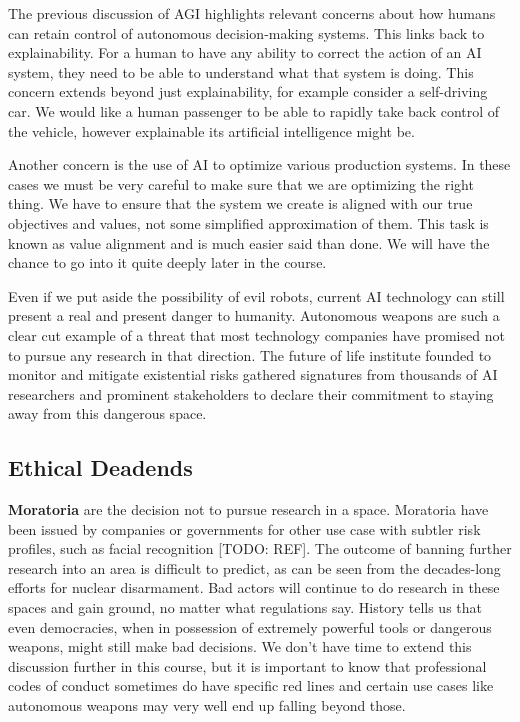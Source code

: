 \documentclass[
]{book}
\theoremstyle{definition}
\theoremstyle{definition}
\theoremstyle{definition}
\theoremstyle{definition}
\theoremstyle{remark}
\begin{document}
The previous discussion of AGI highlights relevant concerns about how humans can retain control of autonomous decision-making systems. This links back to explainability. For a human to have any ability to correct the action of an AI system, they need to be able to understand what that system is doing. This concern extends beyond just explainability, for example consider a self-driving car. We would like a human passenger to be able to rapidly take back control of the vehicle, however explainable its artificial intelligence might be.

Another concern is the use of AI to optimize various production systems. In these cases we must be very careful to make sure that we are optimizing the right thing. We have to ensure that the system we create is aligned with our true objectives and values, not some simplified approximation of them. This task is known as value alignment and is much easier said than done. We will have the chance to go into it quite deeply later in the course.

Even if we put aside the possibility of evil robots, current AI technology can still present a real and present danger to humanity. Autonomous weapons are such a clear cut example of a threat that most technology companies have promised not to pursue any research in that direction. The future of life institute founded to monitor and mitigate existential risks gathered signatures from thousands of AI researchers and prominent stakeholders to declare their commitment to staying away from this dangerous space.

\hypertarget{ethical-deadends}{%
\subsection{Ethical Deadends}\label{ethical-deadends}}

\textbf{Moratoria} are the decision not to pursue research in a space. Moratoria have been issued by companies or governments for other use case with subtler risk profiles, such as facial recognition {[}TODO: REF{]}. The outcome of banning further research into an area is difficult to predict, as can be seen from the decades-long efforts for nuclear disarmament. Bad actors will continue to do research in these spaces and gain ground, no matter what regulations say. History tells us that even democracies, when in possession of extremely powerful tools or dangerous weapons, might still make bad decisions. We don't have time to extend this discussion further in this course, but it is important to know that professional codes of conduct sometimes do have specific red lines and certain use cases like autonomous weapons may very well end up falling beyond those.
\end{document}
